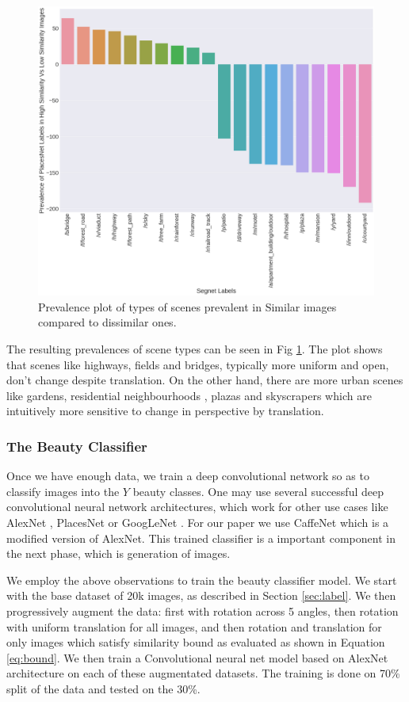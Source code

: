 \begin{figure}[ht]
	\centering
	\includegraphics[width=0.7\columnwidth]{Plot/SimilarityPlacesPrevalence.png}
	\caption{Prevalence plot of types of scenes prevalent in Similar images compared to dissimilar ones.}
	\label{fig:augmentationSimilarity}
\end{figure}

The resulting prevalences of scene types can be seen in Fig \ref{fig:augmentationSimilarity}. The plot shows that scenes like highways, fields and bridges, typically more uniform and open, 
don't change despite translation. On the other hand, there are more urban scenes like gardens, residential neighbourhoods , plazas and skyscrapers which are intuitively more sensitive to change in perspective by translation. 


\subsubsection{The Beauty Classifier}
\label{sec:classifier}
Once we have enough data, we train a deep convolutional network so as to classify images into the $Y$ beauty classes. One may use several successful deep convolutional neural network architectures, which work for other use cases like AlexNet \cite{krizhevsky2012imagenet} , PlacesNet \cite{zhou2014learning} or GoogLeNet \cite{szegedy2015going}.  For our paper we use CaffeNet which is a modified version of AlexNet. This trained classifier is a important component in the next phase, which is generation of images. 

We employ the above observations to train the beauty classifier model. We start with  the base dataset of 20k images, as described in Section \ref{sec:label}. We then progressively augment the data: first with rotation across 5 angles, then rotation with uniform translation for all images, and then rotation and translation for only images which satisfy similarity bound as evaluated as shown in Equation \ref{eq:bound}. 
We then train a Convolutional neural net model based on AlexNet architecture \cite{szegedy2015going} on each of these augmentated datasets. The training is done on 70\% split of the data and tested on the 30\%. 


